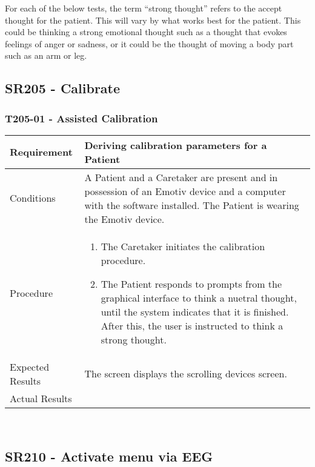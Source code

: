 \documentclass{article}
\begin{document}
For each of the below tests, the term ``strong thought'' refers to the accept thought for the patient. This will vary by what works best for the patient. This could be thinking a strong emotional thought such as a thought that evokes feelings of anger or sadness, or it could be the thought of moving a body part such as an arm or leg.

\subsection{SR205 - Calibrate}
\subsubsection{T205-01 - Assisted Calibration}
\begin{tabular}{| l | p{12cm} |}
    \hline
	Requirement & Deriving calibration parameters for a Patient \\ \hline
	Conditions & A Patient and a Caretaker are present and in possession of an
	Emotiv device and a computer with the software installed. The Patient is
	wearing the Emotiv device. \\ \hline
    Procedure &
\begin{enumerate}
    \item The Caretaker initiates the calibration procedure.
    \item The Patient responds to prompts from the graphical interface to
        think a nuetral thought, until the system indicates that it is
        finished. After this, the user is instructed to think a strong thought.
\end{enumerate} \\ \hline
	Expected Results & The screen displays the scrolling devices screen. \\ \hline
Actual Results & \vspace{1cm} \\ \hline
\end{tabular}

\hfill \\

\subsection{SR210 - Activate menu via EEG}
\end{document}
